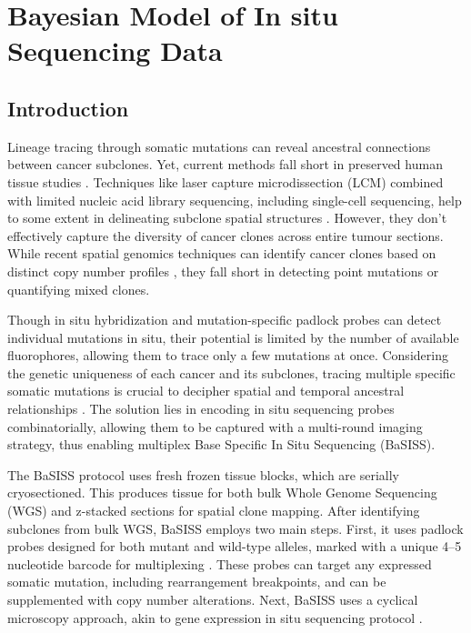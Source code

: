 \chapter{Bayesian Model of In situ Sequencing Data}

\section{Introduction}

Lineage tracing through somatic mutations can reveal ancestral connections between cancer subclones. Yet, current methods fall short in preserved human tissue studies \citep{Yates2015-eg,Jamal-Hanjani2017-ed,Jones2008-tg,Shah2009-lx,Casasent2018-gx,Tarabichi2021-xx}. Techniques like laser capture microdissection (LCM) combined with limited nucleic acid library sequencing, including single-cell sequencing, help to some extent in delineating subclone spatial structures \citep{Shen2000-xj,Casasent2018-gx}. However, they don't effectively capture the diversity of cancer clones across entire tumour sections. While recent spatial genomics techniques can identify cancer clones based on distinct copy number profiles \citep{Zhao2022-dp,Erickson2022-mq}, they fall short in detecting point mutations or quantifying mixed clones.

Though in situ hybridization \citep{Janiszewska2015-kb} and mutation-specific padlock probes \citep{Larsson2010-bp,Grundberg2013-te,Ke2013-km,Baker2017-jz} can detect individual mutations in situ, their potential is limited by the number of available fluorophores, allowing them to trace only a few mutations at once. Considering the genetic uniqueness of each cancer and its subclones, tracing multiple specific somatic mutations is crucial to decipher spatial and temporal ancestral relationships \citep{Nik-Zainal2012-tt}. The solution lies in encoding in situ sequencing probes combinatorially, allowing them to be captured with a multi-round imaging strategy, thus enabling multiplex Base Specific In Situ Sequencing (BaSISS).

The BaSISS protocol uses fresh frozen tissue blocks, which are serially cryosectioned. This produces tissue for both bulk Whole Genome Sequencing (WGS) and z-stacked sections for spatial clone mapping. After identifying subclones from bulk WGS, BaSISS employs two main steps. First, it uses padlock probes designed for both mutant and wild-type alleles, marked with a unique 4–5 nucleotide barcode for multiplexing \citep{Ke2013-km}. These probes can target any expressed somatic mutation, including rearrangement breakpoints, and can be supplemented with copy number alterations. Next, BaSISS uses a cyclical microscopy approach, akin to gene expression in situ sequencing protocol \citep{Ke2013-km,Svedlund2019-xb}.

